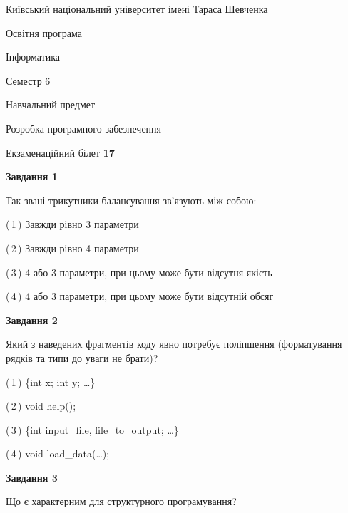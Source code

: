 \documentclass[10pt, ukrainian]{article}
\begin{document}
{{\begin {small}\par
{ \center  Київський національний університет імені Тараса Шевченка \par}
{\parbox {5 cm}{Освітня програма \hfill}{\parbox {7 cm}{Інформатика \hfill}}\parbox {6 cm}{\hfill Семестр 6}}\par
{\parbox {5 cm} {Навчальний предмет \hfill}\parbox {7 cm}{Розробка програмного забезпечення \hfill}\parbox {6cm}{\hfill}\par}\vspace{-7pt} \end{small}}{\center Екзаменаційний білет \No \textbf
{ 17 }\par}}
{
\begin {large}
{\begin {center}\textbf{Завдання 1}\end {center}}\par
Так звані трикутники балансування зв'язують між собою:\par
\vspace{2mm}



(\,1\,) Завжди рівно 3 параметри%



(\,2\,) Завжди рівно 4 параметри%



(\,3\,) 4 або 3 параметри, при цьому може бути відсутня якість%



(\,4\,) 4 або 3 параметри, при цьому може бути відсутній обсяг %


{\begin {center}\textbf{Завдання 2}\end {center}}\par
Який з наведених фрагментів коду явно потребує поліпшення (форматування рядків та типи до уваги не брати)?\par
\vspace{2mm}



(\,1\,) \{int x; int y; …\}%



(\,2\,) void help();%



(\,3\,) \{int input\_file, file\_to\_output; …\}%



(\,4\,) void load\_data(…);%


{\begin {center}\textbf{Завдання 3}\end {center}}\par
Що є характерним для структурного програмування?\par
\vspace{2mm}




\end{large}}
\end{document}

